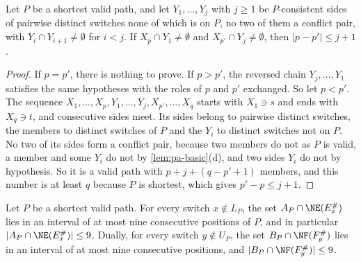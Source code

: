 \begin{lemma}
\label{lem:pa-windows}
Let $P$ be a shortest valid path, and let $Y_1, \dots, Y_j$ with $j \geq 1$ be $P$-consistent sides of pairwise distinct switches none of which is on $P$, no two of them a conflict pair, with $Y_i \cap Y_{i+1} \neq \emptyset$ for $i < j$.
If $X_p \cap Y_1 \neq \emptyset$ and $X_{p'} \cap Y_j \neq \emptyset$, then $|p - p'| \leq j + 1$.
\end{lemma}

\begin{proof}
If $p = p'$, there is nothing to prove.
If $p > p'$, the reversed chain $Y_j, \dots, Y_1$ satisfies the same hypotheses with the roles of $p$ and $p'$ exchanged.
So let $p < p'$.
The sequence $X_1, \dots, X_p, Y_1, \dots, Y_j, X_{p'}, \dots, X_q$ starts with $X_1 \ni s$ and ends with $X_q \ni t$, and consecutive sides meet.
Its sides belong to pairwise distinct switches, the members to distinct switches of $P$ and the $Y_i$ to distinct switches not on $P$.
No two of its sides form a conflict pair, because two members do not as $P$ is valid, a member and some $Y_i$ do not by \cref{lem:pa-basic}(d), and two sides $Y_i$ do not by hypothesis.
So it is a valid path with $p + j + (q - p' + 1)$ members, and this number is at least $q$ because $P$ is shortest, which gives $p' - p \leq j + 1$.
\end{proof}

\begin{lemma}
\label{lem:pa-stars}
Let $P$ be a shortest valid path.
For every switch $x \notin L_P$, the set $A_P \cap \NE(E^\#_x)$ lies in an interval of at most nine consecutive positions of $P$, and in particular $|A_P \cap \NE(E^\#_x)| \leq 9$.
Dually, for every switch $y \notin U_P$, the set $B_P \cap \NF(F^\#_y)$ lies in an interval of at most nine consecutive positions, and $|B_P \cap \NF(F^\#_y)| \leq 9$.
\end{lemma}

